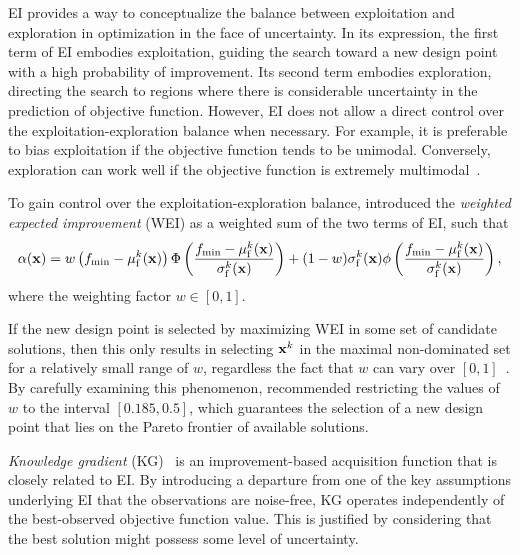 \documentclass[journal ]{new-aiaa}
\begin{document}
EI provides a way to conceptualize the balance between exploitation and exploration in optimization in the face of uncertainty.
In its expression, the first term of EI embodies exploitation, guiding the search toward a new design point with a high probability of improvement.
Its second term embodies exploration, directing the search to regions where there is considerable uncertainty in the prediction of objective function.
However, EI does not allow a direct control over the exploitation-exploration balance when necessary.
For example, it is preferable to bias exploitation if the objective function tends to be unimodal.
Conversely, exploration can work well if the objective function is extremely multimodal~\citep{Sobester2005}.

To gain control over the exploitation-exploration balance, \citet{Sobester2005} introduced the \textit{weighted expected improvement} (WEI) as a weighted sum of the two terms of EI, such that
\begin{equation}\label{eqn40}
    \alpha({\bf x})  = w\left( f_\text{min}-\mu_\text{f}^k({\bf x})\right)\Phi\left(\frac{f_\text{min}-\mu_\text{f}^k({\bf x})}{\sigma_\text{f}^k({\bf x})}\right)
    +(1-w)\sigma_\text{f}^k({\bf x})\phi\left(\frac{f_\text{min}-\mu_\text{f}^k({\bf x})}{\sigma_\text{f}^k({\bf x})}\right),
\end{equation}
where the weighting factor $w \in [0,1]$.

If the new design point is selected by maximizing WEI in some set of candidate solutions, then this only results in selecting ${\bf x}^k$ in the maximal non-dominated set for a relatively small range of $w$, regardless the fact that $w$ can vary over $[0,1]$~\citep{Ath2021}.
By carefully examining this phenomenon, \citet{Ath2021} recommended restricting the values of $w$ to the interval $[0.185,0.5]$, which guarantees the selection of a new design point that lies on the Pareto frontier of available solutions.

\textit{Knowledge gradient} (KG)~\citep{Frazier2008} is an improvement-based acquisition function that is closely related to EI.
By introducing a departure from one of the key assumptions underlying EI that the observations are noise-free, KG operates independently of the best-observed objective function value.
This is justified by considering that the best solution might possess some level of uncertainty.
\end{document}
